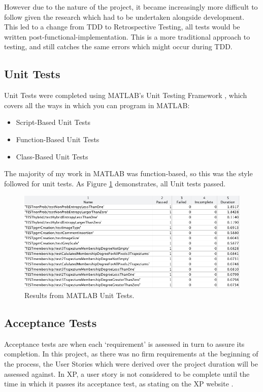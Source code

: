 However due to the nature of the project, it became increasingly more difficult to follow given the research which had to be undertaken alongside development. This led to a change from \acrshort{TDD} to Retrospective Testing, all tests would be written post-functional-implementation. This is a more traditional approach to testing, and still catches the same errors which might occur during \acrshort{TDD}.

\subsection{Unit Tests}

Unit Tests were completed using MATLAB's Unit Testing Framework \cite{testing}, which covers all the ways in which you can program in MATLAB:

\begin{itemize}
  \item Script-Based Unit Tests
  \item Function-Based Unit Tests
  \item Class-Based Unit Tests
  \end{itemize}

The majority of my work in MATLAB was function-based, so this was the style followed for unit tests. As Figure \ref{fig:unit-test-results} demonstrates, all Unit tests passed.

\begin{figure}[H]
  \centering
  \includegraphics[width=\textwidth]{Chapter2/software-img/test-results.png}
  \caption{Results from MATLAB Unit Tests.}
  \label{fig:unit-test-results}
\end{figure}

\newpage
\subsection{Acceptance Tests}

Acceptance tests are when each `requirement' is assessed in turn to assure its completion. In this project, as there was no firm requirements at the beginning of the process, the User Stories which were derived over the project duration will be assessed against. In \acrfull{XP}, a user story is not considered to be complete until the time in which it passes its acceptance test, as stating on the \acrshort{XP} website \cite{Acceptance_Tests}.

